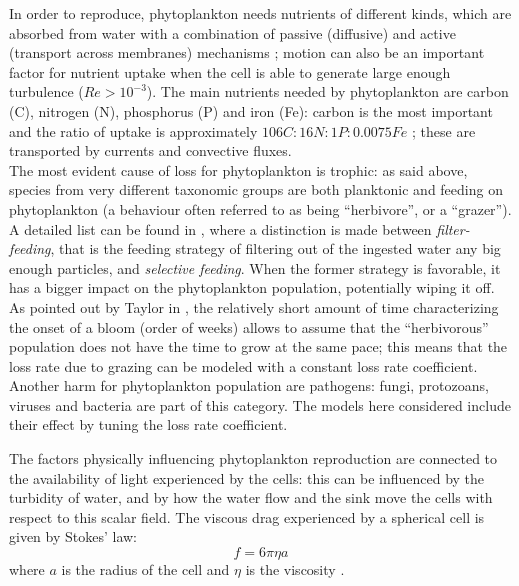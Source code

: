 In order to reproduce, phytoplankton needs nutrients of different kinds, which are absorbed from water with a combination of passive (diffusive) and active (transport across membranes) mechanisms \autocite[section 4.2]{reynolds2006ecology}; motion can also be an important factor for nutrient uptake when the cell is able to generate large enough turbulence (\( Re>10^{-3}\))\autocite{riebesell2002supply}. The main nutrients needed by phytoplankton are carbon (C), nitrogen (N), phosphorus (P) and iron (Fe): carbon is the most important and the ratio of uptake is approximately \(106 C : 16 N : 1 P : 0.0075 Fe\) \autocite{Bristow2017NutrientsOcean}; these are transported by currents and convective fluxes. \\
The most evident cause of loss for phytoplankton is trophic: as said above, species from very different taxonomic groups are both planktonic and feeding on phytoplankton (a behaviour often referred to as being ``herbivore'', or a ``grazer''). A detailed list can be found in \autocite[chapter 6.4]{reynolds2006ecology}, where a distinction is made between \textit{filter-feeding}, that is the feeding strategy of filtering out of the ingested water any big enough particles, and \textit{selective feeding}. When the former strategy is favorable, it has a bigger impact on the phytoplankton population, potentially wiping it off. As pointed out by Taylor in \autocite{Taylor2011ShutdownBlooms}, the relatively short amount of time characterizing the onset of a bloom (order of weeks) allows to assume that the ``herbivorous'' population does not have the time to grow at the same pace; this means that the loss rate due to grazing can be modeled with a constant loss rate coefficient. \\
Another harm for phytoplankton population are pathogens: fungi, protozoans, viruses and bacteria are part of this category\autocite[section 6.5]{reynolds2006ecology}. The models here considered include their effect by tuning the loss rate coefficient. 

The factors physically influencing phytoplankton reproduction are connected to the availability of light experienced by the cells: this can be influenced by the turbidity of water, and by how the water flow and the sink move the cells with respect to this scalar field. The viscous drag experienced by a spherical cell is given by Stokes' law:
\[f = 6 \pi \eta a\]
where $a$ is the radius of the cell and $\eta$ is the viscosity \autocite[chapter 4]{berg1993random}.

